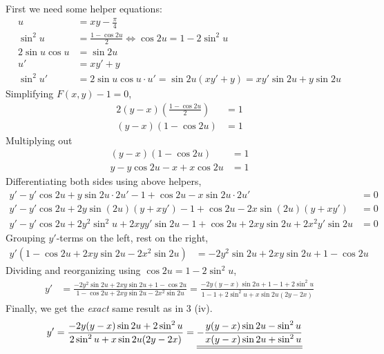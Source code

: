 First we need some helper equations:
\begin{align*}
  u &= xy-\frac{\pi}{4} \\
  \sin^2{u} &= \frac{1-\cos{2u}}{2}
      \iff \cos{2u} = 1 - 2\sin^2{u} \\
  2\sin{u}\cos{u} &= \sin{2u} \\
  u' &= xy' + y \\
  \sin^2{u}' &= 2\sin{u}\cos{u}\cdot u' = \sin{2u}(xy'+y) =
      xy'\sin{2u}+y\sin{2u}
\end{align*}
Simplifying $F(x,y)-1 = 0$,
\begin{align*}
  2(y-x)\left(\frac{1-\cos{2u}}{2}\right) &= 1 \\
  (y-x)(1-\cos{2u}) &= 1
\end{align*}
Multiplying out
\begin{align*}
  (y-x)(1-\cos{2u}) &= 1 \\
  y - y\cos{2u} -x + x\cos{2u} &= 1
\end{align*}
Differentiating both sides using above helpers,
\begin{align*}
  y' - y'\cos{2u} + y\sin{2u}\cdot 2u' - 1 + \cos{2u} - x\sin{2u}\cdot 2u' &= 0 \\
  y' - y'\cos{2u} + 2y\sin{(2u)}(y+xy') - 1 + \cos{2u} - 2x\sin{(2u)}(y+xy') &= 0 \\
  y' - y'\cos{2u} + 2y^2\sin^2{u} + 2xyy'\sin{2u} - 1 + \cos{2u}
    +2xy\sin{2u} + 2x^2y'\sin{2u} &= 0
\end{align*}
Grouping $y'$-terms on the left, rest on the right,
\begin{align*}
  y'\left( 1 - \cos{2u} + 2xy\sin{2u} - 2x^2\sin{2u} \right)
    &= -2y^2\sin{2u} + 2xy\sin{2u} + 1 - \cos{2u}
\end{align*}
Dividing and reorganizing using $\cos{2u} = 1 - 2\sin^2{u}$,
\begin{align*}
  y' &= \frac{-2y^2\sin{2u} + 2xy\sin{2u} + 1 - \cos{2u}}
             {1 - \cos{2u} + 2xy\sin{2u} - 2x^2\sin{2u}}
      = \frac{-2y(y-x)\sin{2u} + 1 - 1 + 2\sin^2{u}}
             {1 - 1 + 2\sin^2{u} + x\sin{2u}(2y-2x)}
\end{align*}
Finally, we get the \textit{exact} same result as in 3 (iv).
\begin{align*}
  y' &= \frac{-2y(y-x)\sin{2u} + 2\sin^2{u}}
             {2\sin^2{u} + x\sin{2u}(2y-2x)}
      = {\underline{\underline{-\frac{y(y-x)\sin{2u} - \sin^2{u}}
                    {x(y-x)\sin{2u} + \sin^2{u}}}}}
\end{align*}

